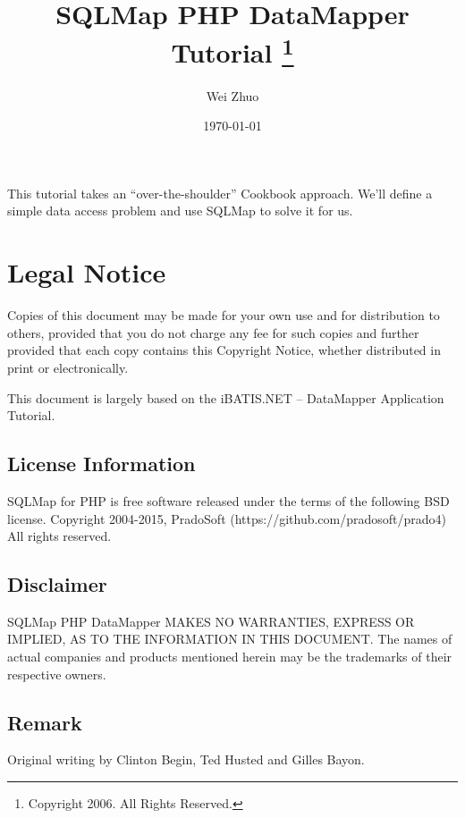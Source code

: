 \documentclass{article}
\title{\vspace{-2.5cm} \bfseries SQLMap PHP DataMapper Tutorial
    \thanks{Copyright 2006. All Rights Reserved.}
}
\author{Wei Zhuo}
\date{\today}
\begin{document}
\maketitle

This tutorial takes an ``over-the-shoulder'' Cookbook approach. We'll define a
simple data access problem and use SQLMap to solve it for us.


\section*{Legal Notice}

Copies of this document may be made for your own use and for distribution to
others, provided that you do not charge any fee for such copies and further
provided that each copy contains this Copyright Notice, whether distributed in
print or electronically.

This document is largely based on the iBATIS.NET -- DataMapper Application
Tutorial.

\subsection*{License Information}
SQLMap for PHP is free software released under the terms of the following BSD
license. Copyright 2004-2015, PradoSoft (https://github.com/pradosoft/prado4) All rights
reserved.

\subsection*{Disclaimer}
SQLMap PHP DataMapper MAKES NO WARRANTIES, EXPRESS OR IMPLIED, AS TO THE
INFORMATION IN THIS DOCUMENT. The names of actual companies and products
mentioned herein may be the trademarks of their respective owners.

\subsection*{Remark}
Original writing by Clinton Begin, Ted Husted and Gilles Bayon.




\end{document}
